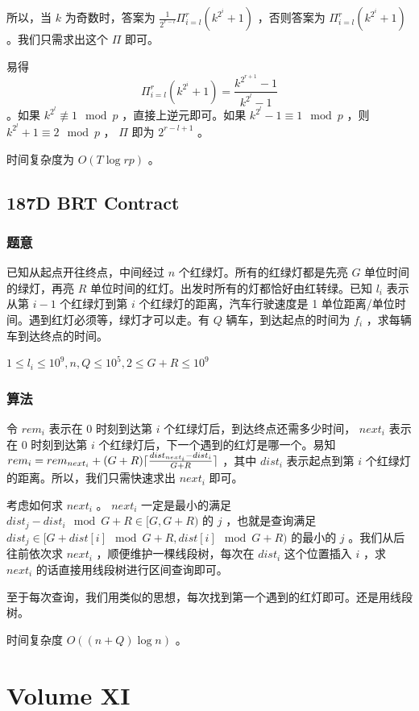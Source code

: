 \documentclass[11pt]{article}
\begin{document}
    所以，当 $k$ 为奇数时，答案为 $\frac{1}{2^{r - l}} \Pi_{i = l}^r (k^{2^i} + 1)$ ，否则答案为 $\Pi_{i = l}^r (k^{2^i} + 1)$ 。我们只需求出这个 $\Pi$ 即可。

    易得 $$\Pi_{i = l}^r (k^{2^i} + 1) = \frac{k^{2^{r + 1}} - 1}{k^{2^l} - 1}$$ 。如果 $k^{2^l} \not\equiv 1 \mod{p}$ ，直接上逆元即可。如果 $k^{2^l} - 1 \equiv 1 \mod{p}$ ，则 $k^{2^l} + 1 \equiv 2 \mod{p}$ ， $\Pi$ 即为 $2^{r - l + 1}$ 。

    时间复杂度为 $O(T \log rp)$ 。
\subsection{187D  BRT Contract}
\label{sec-10-9}
\subsubsection{题意}
\label{sec-10-9-1}

    已知从起点开往终点，中间经过 $n$ 个红绿灯。所有的红绿灯都是先亮 $G$ 单位时间的绿灯，再亮 $R$ 单位时间的红灯。出发时所有的灯都恰好由红转绿。已知 $l_i$ 表示从第 $i - 1$ 个红绿灯到第 $i$ 个红绿灯的距离，汽车行驶速度是 1 单位距离/单位时间。遇到红灯必须等，绿灯才可以走。有 $Q$ 辆车，到达起点的时间为 $f_i$ ，求每辆车到达终点的时间。

    $1 \leq l_i \leq 10^9, n, Q \leq 10^5, 2 \leq G + R \leq 10^9$
\subsubsection{算法}
\label{sec-10-9-2}

    令 $rem_i$ 表示在 0 时刻到达第 $i$ 个红绿灯后，到达终点还需多少时间， $next_i$ 表示在 0 时刻到达第 $i$ 个红绿灯后，下一个遇到的红灯是哪一个。易知 $rem_i = rem_{next_i} + (G + R){\lceil \frac{dist_{next_i} - dist_i}{G + R} \rceil}$ ，其中 $dist_i$ 表示起点到第 $i$ 个红绿灯的距离。所以，我们只需快速求出 $next_i$ 即可。

    考虑如何求 $next_i$ 。 $next_i$ 一定是最小的满足 $dist_j - dist_i \mod{G + R} \in [G, G + R)$ 的 $j$ ，也就是查询满足 $dist_j \in [G + dist[i] \mod{G + R}, dist[i] \mod{G + R})$ 的最小的 $j$ 。我们从后往前依次求 $next_i$ ，顺便维护一棵线段树，每次在 $dist_i$ 这个位置插入 $i$ ，求 $next_i$ 的话直接用线段树进行区间查询即可。

    至于每次查询，我们用类似的思想，每次找到第一个遇到的红灯即可。还是用线段树。

    时间复杂度 $O((n + Q) \log n)$ 。
\section{Volume XI}
\label{sec-11}
\end{document}
